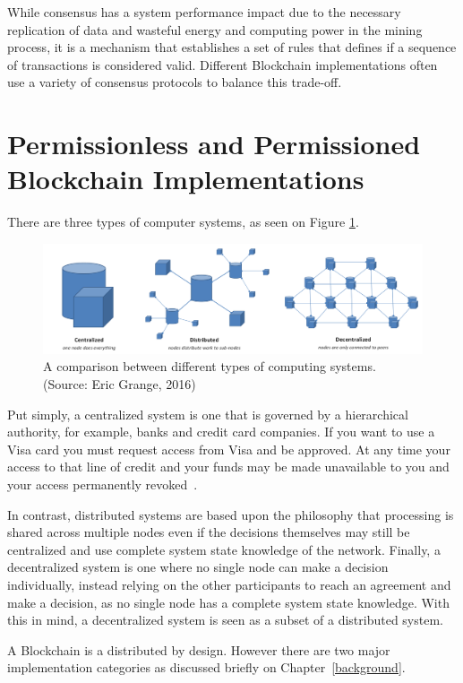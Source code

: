 While consensus has a system performance impact due to the necessary
replication of data and wasteful energy and computing power in the mining
process, it is a mechanism that establishes a set of rules that defines if a
sequence of transactions is considered valid.  Different Blockchain
implementations often use a variety of consensus protocols to balance this
trade-off.

\section{Permissionless and Permissioned Blockchain Implementations}

There are three types of computer systems, as seen on Figure
\ref{fig:typesofnetworks}.

\begin{figure}[h]
	\centering
	\includegraphics[width=1\linewidth]{imgs/typesofnetworks.png}
  \caption{\label{fig:typesofnetworks} A comparison between different types of
  computing systems. (Source: Eric Grange, 2016)}
\end{figure}

Put simply, a centralized system is one that is governed by a hierarchical
authority, for example, banks and credit card companies. If you want to use a
Visa card you must request access from Visa and be approved. At any time your
access to that line of credit and your funds may be made unavailable to you and
your access permanently revoked~\cite{Dreifuerst2018}.

In contrast, distributed systems are based upon the philosophy that processing
is shared across multiple nodes even if the decisions themselves may still be
centralized and use complete system state knowledge of the network. Finally, a
decentralized system is one where no single node can make a decision
individually, instead relying on the other participants to reach an agreement
and make a decision, as no single node has a complete system state knowledge.
With this in mind, a decentralized system is seen as a subset of a distributed
system.

A Blockchain is a distributed by design. However there are two major
implementation categories as discussed briefly on Chapter~\ref{background}.

